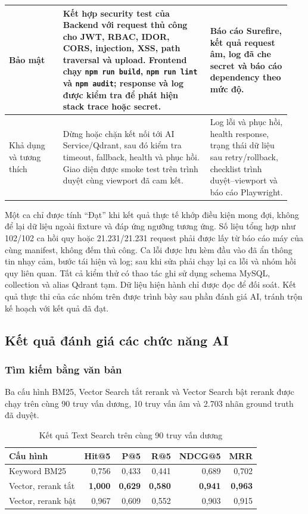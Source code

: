 \begin{longtable}{|p{0.18\linewidth}|p{0.49\linewidth}|p{0.27\linewidth}|}
Bảo mật & Kết hợp security test của Backend với request thủ công cho JWT, RBAC, IDOR, CORS, injection, XSS, path traversal và upload. Frontend chạy \texttt{npm run build}, \texttt{npm run lint} và \texttt{npm audit}; response và log được kiểm tra để phát hiện stack trace hoặc secret. & Báo cáo Surefire, kết quả request âm, log đã che secret và báo cáo dependency theo mức độ. \\ \hline
Khả dụng và tương thích & Dừng hoặc chặn kết nối tới AI Service/Qdrant, sau đó kiểm tra timeout, fallback, health và phục hồi. Giao diện được smoke test trên trình duyệt cùng viewport đã cam kết. & Log lỗi và phục hồi, health response, trạng thái dữ liệu sau retry/rollback, checklist trình duyệt--viewport và báo cáo Playwright. \\ \hline
\end{longtable}

Một ca chỉ được tính \enquote{Đạt} khi kết quả thực tế khớp điều kiện mong đợi, không để lại dữ liệu ngoài fixture và đáp ứng ngưỡng tương ứng. Số liệu tổng hợp như 102/102 ca hồi quy hoặc 21.231/21.231 request phải được lấy từ báo cáo máy của cùng manifest, không đếm thủ công. Ca lỗi được lưu kèm đầu vào đã ẩn thông tin nhạy cảm, bước tái hiện và log; sau khi sửa phải chạy lại ca lỗi và nhóm hồi quy liên quan.
Tất cả kiểm thử có thao tác ghi sử dụng schema MySQL, collection và alias Qdrant tạm. Dữ liệu hiện hành chỉ được đọc để đối soát. Kết quả thực thi của các nhóm trên được trình bày sau phần đánh giá AI, tránh trộn kế hoạch với kết quả đã đạt.

\subsection{Kết quả đánh giá các chức năng AI}

\subsubsection{Tìm kiếm bằng văn bản}

Ba cấu hình BM25, Vector Search tắt rerank và Vector Search bật rerank được chạy trên cùng 90 truy vấn dương, 10 truy vấn âm và 2.703 nhãn ground truth đã duyệt.
\begin{table}[H]
\centering
\caption{Kết quả Text Search trên cùng 90 truy vấn dương}
\label{tab:text-results}
\begin{tabularx}{\linewidth}{|X|r|r|r|r|r|}
\hline
\textbf{Cấu hình} & \textbf{Hit@5} & \textbf{P@5} & \textbf{R@5} & \textbf{NDCG@5} & \textbf{MRR} \\ \hline
Keyword BM25 & 0,756 & 0,433 & 0,441 & 0,689 & 0,702 \\ \hline
Vector, rerank tắt & \textbf{1,000} & \textbf{0,629} & \textbf{0,580} & \textbf{0,941} & \textbf{0,963} \\ \hline
Vector, rerank bật & 0,967 & 0,609 & 0,552 & 0,903 & 0,915 \\ \hline
\end{tabularx}
\end{table}

